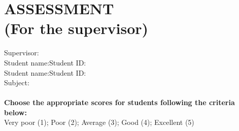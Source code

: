 \section*{ASSESSMENT\\\fontsize{14pt}{0pt}\selectfont \vspace{4pt}\textnormal{(For the supervisor)}}
\thispagestyle{empty}
\vspace{-16pt}
\hspace{-1cm}Supervisor:\dotfill\\
Student name:\dotfill Student ID:\dotfill\\
Student name:\dotfill Student ID:\dotfill\\
Subject: \dotfill\\
\\
\textbf{Choose the appropriate scores for students following the criteria below:}\\
Very poor (1); Poor (2); Average (3); Good (4); Excellent (5) 
